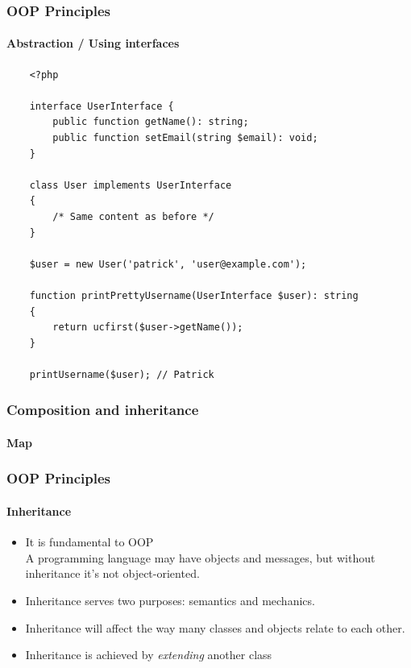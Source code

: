 \begin{frame}[fragile,c]
    \frametitle{OOP Principles}
    \framesubtitle{Abstraction / Using interfaces}

    \begin{lstlisting}
    <?php

    interface UserInterface {
        public function getName(): string;
        public function setEmail(string $email): void;
    }

    class User implements UserInterface
    {
        /* Same content as before */
    }

    $user = new User('patrick', 'user@example.com');

    function printPrettyUsername(UserInterface $user): string
    {
        return ucfirst($user->getName());
    }

    printUsername($user); // Patrick
    \end{lstlisting}
\end{frame}

\begin{frame}[fragile,c]
    \frametitle{Composition and inheritance}
    \framesubtitle{Map}

\end{frame}

\begin{frame}
    \frametitle{OOP Principles}
    \framesubtitle{Inheritance}

    \begin{itemize}
        \item It is fundamental to OOP\pause
              \\\textcolor{ecgrey!50}{A programming language may have objects and messages, but without inheritance it's not object-oriented.}
        \pause
        \item Inheritance serves two purposes: semantics and mechanics.
        \pause
        \item Inheritance will affect the way many classes and objects relate to each other.
        \pause
        \item Inheritance is achieved by \textit{extending} another class
    \end{itemize}
\end{frame}

